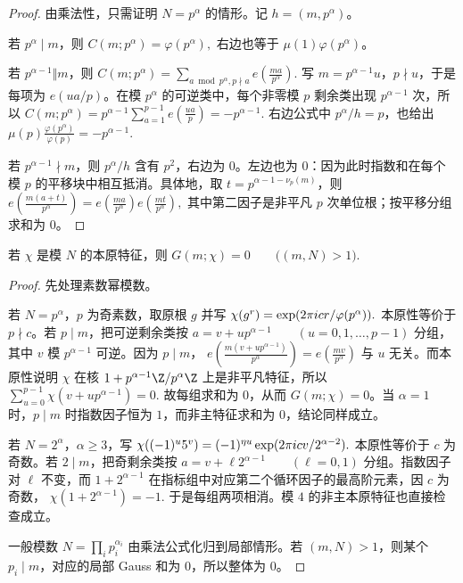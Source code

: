 \begin{proof}
由乘法性，只需证明 $N=p^\alpha$ 的情形。记 $h=(m,p^\alpha)$。

若 $p^\alpha\mid m$，则
\(
  C(m;p^\alpha)=\varphi(p^\alpha),
\)
右边也等于 $\mu(1)\varphi(p^\alpha)$。

若 $p^{\alpha-1}\Vert m$，则
\(
  C(m;p^\alpha)
  =
  \sum_{a\bmod p^\alpha,\allowbreak{}p\nmid a}
  e\!\left(\frac{ma}{p^\alpha}\right).
\)
写 $m=p^{\alpha-1}u$，$p\nmid u$，于是每项为 $e(ua/p)$。在模 $p^\alpha$ 的可逆类中，每个非零模 $p$ 剩余类出现
$p^{\alpha-1}$ 次，所以
\(
  C(m;p^\alpha)
  =
  p^{\alpha-1}\sum_{a=1}^{p-1}e\!\left(\frac{ua}{p}\right)
  =
  -p^{\alpha-1}.
\)
右边公式中 $p^\alpha/h=p$，也给出
\(
  \mu(p)\frac{\varphi(p^\alpha)}{\varphi(p)}
  =
  -p^{\alpha-1}.
\)

若 $p^{\alpha-1}\nmid m$，则 $p^\alpha/h$ 含有 $p^2$，右边为 $0$。左边也为 $0$：因为此时指数和在每个模 $p$ 的平移块中相互抵消。具体地，取 $t=p^{\alpha-1-\nu_p(m)}$，则
\(
  e\!\left(\frac{m(a+t)}{p^\alpha}\right)
  =
  e\!\left(\frac{ma}{p^\alpha}\right)
  e\!\left(\frac{mt}{p^\alpha}\right),
\)
其中第二因子是非平凡 $p$ 次单位根；按平移分组求和为 $0$。
\end{proof}

\begin{theorem}[本原特征的消失性]
若 $\chi$ 是模 $N$ 的本原特征，则
\(
  G(m;\chi)=0\qquad\bigl((m,N)>1\bigr).
\)
\end{theorem}

\begin{proof}
先处理素数幂模数。

若 $N=p^\alpha$，$p$ 为奇素数，取原根 $g$ 并写
\(
  \chi(g^r)=\exp(2\pi i cr/\varphi(p^\alpha)).
\)
本原性等价于 $p\nmid c$。若 $p\mid m$，把可逆剩余类按
\(
  a=v+up^{\alpha-1}\qquad(u=0,1,\ldots,p-1)
\)
分组，其中 $v$ 模 $p^{\alpha-1}$ 可逆。因为 $p\mid m$，
\(
  e\!\left(\frac{m(v+up^{\alpha-1})}{p^\alpha}\right)
  =
  e\!\left(\frac{mv}{p^\alpha}\right)
\)
与 $u$ 无关。而本原性说明 $\chi$ 在核
\(
  1+p^{\alpha-1}\Z/p^\alpha\Z
\)
上是非平凡特征，所以
\(
  \sum_{u=0}^{p-1}\chi(v+up^{\alpha-1})=0.
\)
故每组求和为 $0$，从而 $G(m;\chi)=0$。当 $\alpha=1$ 时，$p\mid m$ 时指数因子恒为 $1$，而非主特征求和为 $0$，结论同样成立。

若 $N=2^\alpha$，$\alpha\ge3$，写
\(
  \chi((-1)^u5^v)=(-1)^{\eta u}\exp(2\pi i cv/2^{\alpha-2}).
\)
本原性等价于 $c$ 为奇数。若 $2\mid m$，把奇剩余类按
\(
  a=v+\ell 2^{\alpha-1}\qquad(\ell=0,1)
\)
分组。指数因子对 $\ell$ 不变，而
\(
  1+2^{\alpha-1}
\)
在指标组中对应第二个循环因子的最高阶元素，因 $c$ 为奇数，
\(
  \chi(1+2^{\alpha-1})=-1.
\)
于是每组两项相消。模 $4$ 的非主本原特征也直接检查成立。

一般模数
\(
  N=\prod_i p_i^{\alpha_i}
\)
由乘法公式化归到局部情形。若 $(m,N)>1$，则某个 $p_i\mid m$，对应的局部 Gauss 和为 $0$，所以整体为 $0$。
\end{proof}

